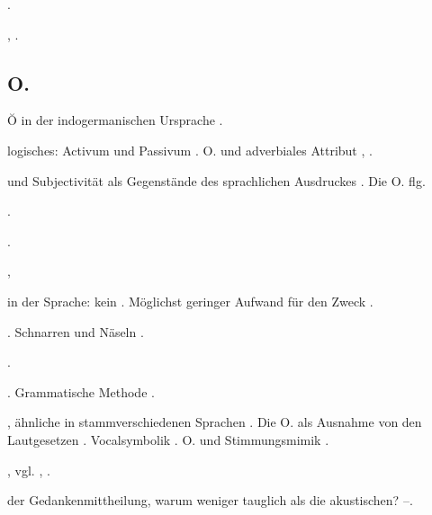 \begin{register}
 \pageref{sp.103}.

 \pageref{sp.36}, \pageref{sp.182}.


\subsection*{O.}\label{reg.O}

Ŏ in der indogermanischen Ursprache \pageref{sp.186}.


 logisches: Activum und Passivum \pageref{sp.95}. O. und adverbiales Attribut \pageref{sp.102}, \pageref{sp.461}.

 und Subjectivität als Gegenstände des sprachlichen Ausdruckes \pageref{sp.438}. Die O. \pageref{sp.438} flg.

 \pageref{sp.104}.

 \pageref{sp.282}.

,  \pageref{sp.163}

 in der Sprache: kein  \pageref{sp.100}. Möglichst geringer Aufwand für den Zweck \pageref{sp.182}.

. Schnarren und Näseln \pageref{sp.184}.

 \pageref{sp.282}.


. Grammatische Methode \pageref{sp.110}.


, ähnliche in stammverschiedenen Sprachen \pageref{sp.154}. Die O. als Ausnahme von den Lautgesetzen \pageref{sp.208}.  Vocalsymbolik \pageref{sp.255}.  O. und Stimmungsmimik \pageref{sp.378}.

, vgl. ,  \pageref{sp.103}.


 der Gedankenmittheilung, warum weniger tauglich als die akustischen? \pageref{sp.311}–\pageref{sp.312}.


\end{register}
